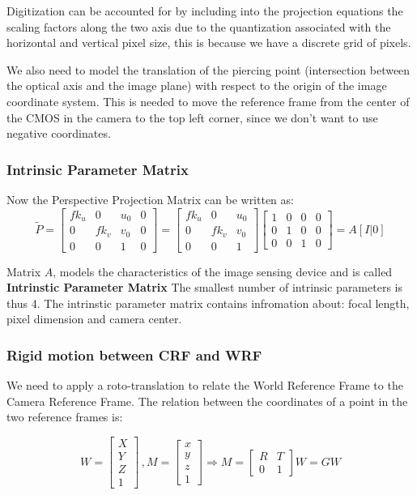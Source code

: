 \documentclass{article}
\begin{document}
Digitization can be accounted for by including into the projection equations the scaling factors along the two axis due to the quantization associated with the horizontal and vertical pixel size, this is because we have a discrete grid of pixels.

We also need to model the translation of the piercing point (intersection between the optical axis and the image plane) with respect to the origin of the image coordinate system.
This is needed to move the reference frame from the center of the CMOS in the camera to the top left corner, since we don't want to use negative coordinates.

\subsubsection{Intrinsic Parameter Matrix}
Now the Perspective Projection Matrix can be written as:
$$
\tilde{P} = 
\begin{bmatrix}
  fk_u & 0 & u_0 & 0 \\
  0 & fk_v & v_0 & 0 \\
  0 & 0 & 1 & 0 
\end{bmatrix}
=
\begin{bmatrix}
  fk_u & 0 & u_0 \\
  0 & fk_v & v_0 \\
  0 & 0 & 1 
\end{bmatrix}
\begin{bmatrix}
  1 & 0 & 0 & 0 \\
  0 & 1 & 0 & 0 \\
  0 & 0 & 1 & 0 
\end{bmatrix}
= A[I|0]
$$

Matrix $A$, models the characteristics of the image sensing device and is called \textbf{Intrinstic Parameter Matrix}
The smallest number of intrinsic parameters is thus 4.
The intrinstic parameter matrix contains infromation about: focal length, pixel dimension and camera center.

\subsubsection{Rigid motion between CRF and WRF}
We need to apply a roto-translation to relate the World Reference Frame to the Camera Reference Frame.
The relation between the coordinates of a point in the two reference frames is:

$$
W =
\begin{bmatrix}
X \\ Y \\ Z \\ 1
\end{bmatrix}
\,,
M=
\begin{bmatrix}
x\\ y\\ z\\1
\end{bmatrix}
\Rightarrow
M=
\begin{bmatrix}
R & T \\
0 & 1
\end{bmatrix}
W = GW
$$
\end{document}
